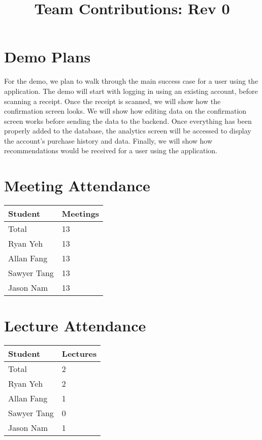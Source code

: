 \documentclass{article}
\title{Team Contributions: Rev 0\\\progname}
\author{\authname}
\date{}
\begin{document}
\maketitle

\section{Demo Plans}

For the demo, we plan to walk through the main success case for a user using the application.
The demo will start with logging in using an existing account, before scanning a receipt. Once
the receipt is scanned, we will show how the confirmation screen looks. We will show how editing
data on the confirmation screen works before sending the data to the backend. Once everything has
been properly added to the database, the analytics screen will be accessed to display the account's
purchase history and data. Finally, we will show how recommendations would be received for a user
using the application.

\section{Meeting Attendance}

\begin{table}[H]
\centering
\begin{tabular}{ll}
\toprule
\textbf{Student} & \textbf{Meetings}\\
\midrule
Total & 13\\
Ryan Yeh & 13\\
Allan Fang & 13\\
Sawyer Tang & 13\\
Jason Nam & 13\\
\bottomrule
\end{tabular}
\end{table}

\section{Lecture Attendance}

\begin{table}[H]
\centering
\begin{tabular}{ll}
\toprule
\textbf{Student} & \textbf{Lectures}\\
\midrule
Total & 2\\
Ryan Yeh & 2\\
Allan Fang & 1\\
Sawyer Tang & 0\\
Jason Nam & 1\\
\bottomrule
\end{tabular}
\end{table}
\end{document}
